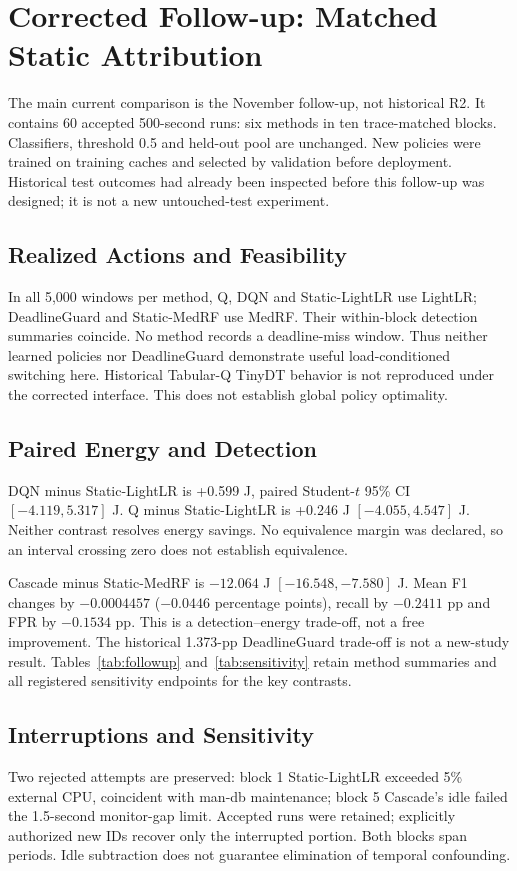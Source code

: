\section{Corrected Follow-up: Matched Static Attribution}\label{sec:dynamicresults}
The main current comparison is the November follow-up, not historical R2. It contains 60 accepted 500-second runs: six methods in ten trace-matched blocks. Classifiers, threshold 0.5 and held-out pool are unchanged. New policies were trained on training caches and selected by validation before deployment. Historical test outcomes had already been inspected before this follow-up was designed; it is not a new untouched-test experiment.

\subsection{Realized Actions and Feasibility}
In all 5,000 windows per method, Q, DQN and Static-LightLR use LightLR; DeadlineGuard and Static-MedRF use MedRF. Their within-block detection summaries coincide. No method records a deadline-miss window. Thus neither learned policies nor DeadlineGuard demonstrate useful load-conditioned switching here. Historical Tabular-Q TinyDT behavior is not reproduced under the corrected interface. This does not establish global policy optimality.

\subsection{Paired Energy and Detection}
DQN minus Static-LightLR is +0.599 J, paired Student-$t$ 95\% CI $[-4.119,5.317]$ J. Q minus Static-LightLR is +0.246 J $[-4.055,4.547]$ J. Neither contrast resolves energy savings. No equivalence margin was declared, so an interval crossing zero does not establish equivalence.

Cascade minus Static-MedRF is $-12.064$ J $[-16.548,-7.580]$ J. Mean F1 changes by $-0.0004457$ ($-0.0446$ percentage points), recall by $-0.2411$ pp and FPR by $-0.1534$ pp. This is a detection--energy trade-off, not a free improvement. The historical 1.373-pp DeadlineGuard trade-off is not a new-study result.
Tables~\ref{tab:followup} and~\ref{tab:sensitivity} retain method summaries and all registered sensitivity endpoints for the key contrasts.


\subsection{Interruptions and Sensitivity}
Two rejected attempts are preserved: block 1 Static-LightLR exceeded 5\% external CPU, coincident with man-db maintenance; block 5 Cascade's idle failed the 1.5-second monitor-gap limit. Accepted runs were retained; explicitly authorized new IDs recover only the interrupted portion. Both blocks span periods. Idle subtraction does not guarantee elimination of temporal confounding.

